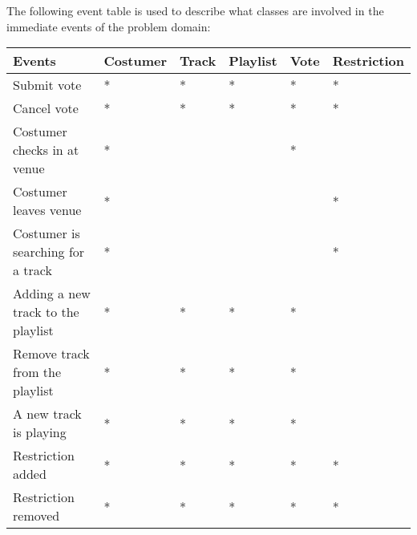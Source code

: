 The following event table is used to describe what classes are involved in the immediate events of the problem domain:

\begin{center}
    \begin{tabular}{|l|l|l|l|l|l|}
    \hline
    \textbf{Events} & Costumer & Track & Playlist & Vote & Restriction \\ \hline
    Submit vote & * & * & * & * & * \\ \hline
    Cancel vote & * & * & * & * & * \\ \hline
    Costumer checks in at venue & * &   &   & * &   \\ \hline
    Costumer leaves venue & * &   &   &   & * \\ \hline
    Costumer is searching for a track & * &   &   &  & * \\ \hline
    Adding a new track to the playlist & * & * & * & * &   \\ \hline
    Remove track from the playlist & * & * & * & * &   \\ \hline
    A new track is playing & * & * & * & * &   \\ \hline
    Restriction added & * & * & * & * & * \\ \hline
    Restriction removed & * & * & * & * & * \\ \hline
    \end{tabular}
\end{center}
